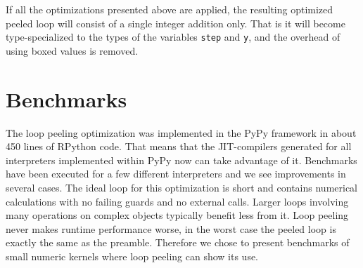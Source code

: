 \documentclass[preprint]{sigplanconf}
\begin{document}
If all the optimizations presented above are applied, the resulting
optimized peeled loop will consist of a single integer addition
only. That is it will become type-specialized to the types of the
variables \lstinline{step} and \lstinline{y}, and the overhead of
using boxed values is removed.

\section{Benchmarks}

The loop peeling optimization was implemented in the PyPy
framework in about 450 lines of RPython code. That means that the JIT-compilers generated for all
interpreters implemented within PyPy now can take advantage of
it. Benchmarks have been executed for a few different interpreters and
we see improvements in several cases. The ideal loop for this optimization
is short and contains numerical calculations with no failing guards and no
external calls. Larger loops involving many operations on complex objects
typically benefit less from it. Loop peeling never makes runtime performance worse, in
the worst case the peeled loop is exactly the same as the preamble. Therefore we
chose to present benchmarks of small numeric kernels where loop peeling can show
its use.
\end{document}
